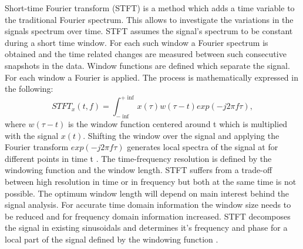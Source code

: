 Short-time Fourier transform (STFT) is a method which adds a time variable to the traditional Fourier spectrum. This allows to investigate the variations in the signals spectrum over time. STFT assumes the signal's spectrum to be constant during a short time window. For each such window a Fourier spectrum is obtained and the time related changes are measured between such consecutive snapshots in the data. Window functions are defined which separate the signal. For each window a Fourier is applied. The process is mathematically expressed in the following:  
\begin{equation}
    STFT_{x}(t,f) = \int_{- \inf}^{+ \inf}x(\tau) w(\tau -t) exp(-j2\pi f \tau),
\end{equation}
where  $w(\tau -t)$ is the window function centered around t which is multiplied with the signal $x(t)$. Shifting the window over the signal and applying the Fourier transform $exp(-j2\pi f \tau)$ generates local spectra of the signal at for different points in time t \cite{FENG2013}. The time-frequency resolution is defined by the windowing function and the window length. STFT suffers from a trade-off between high resolution in time or in frequency but both at the same time is not possible. The optimum window length will depend on main interest behind the signal analysis. For accurate time domain information the window size needs to be reduced and for frequency domain information increased. STFT  decomposes the signal in existing sinusoidals and determines it's frequency and phase for a local part of the signal defined by the windowing function \cite{Hlawatsch1992}. 

